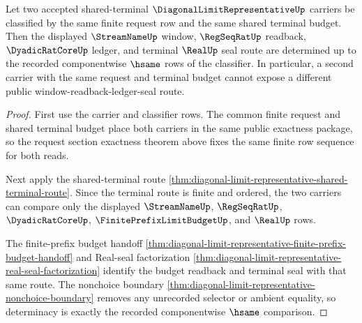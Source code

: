 \begin{theorem}
\label{thm:diagonal-limit-representative-shared-window-readback-determinacy}
Let two accepted shared-terminal $\DiagonalLimitRepresentativeUp$ carriers be classified by the same finite request row and the same shared terminal budget. Then the displayed $\StreamNameUp$ window, $\RegSeqRatUp$ readback, $\DyadicRatCoreUp$ ledger, and terminal $\RealUp$ seal route are determined up to the recorded componentwise $\hsame$ rows of the classifier. In particular, a second carrier with the same request and terminal budget cannot expose a different public window-readback-ledger-seal route.
\end{theorem}
\begin{proof}
First use the carrier and classifier rows. The common finite request and shared terminal budget place both carriers in the same public exactness package, so the request section exactness theorem above fixes the same finite row sequence for both reads.

Next apply the shared-terminal route \autoref{thm:diagonal-limit-representative-shared-terminal-route}. Since the terminal route is finite and ordered, the two carriers can compare only the displayed $\StreamNameUp$, $\RegSeqRatUp$, $\DyadicRatCoreUp$, $\FinitePrefixLimitBudgetUp$, and $\RealUp$ rows.

The finite-prefix budget handoff \autoref{thm:diagonal-limit-representative-finite-prefix-budget-handoff} and Real-seal factorization \autoref{thm:diagonal-limit-representative-real-seal-factorization} identify the budget readback and terminal seal with that same route. The nonchoice boundary \autoref{thm:diagonal-limit-representative-nonchoice-boundary} removes any unrecorded selector or ambient equality, so determinacy is exactly the recorded componentwise $\hsame$ comparison.
\end{proof}

